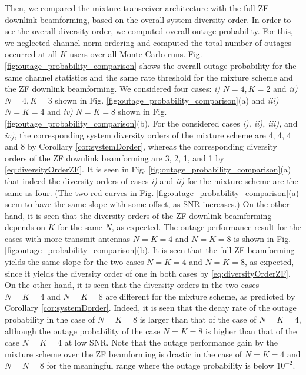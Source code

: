 \documentclass[11pt, draft, onecolumn ]{IEEEtran}
\begin{document}
Then, we compared the mixture transceiver architecture with the full ZF downlink beamforming, based on the overall system diversity order. In order to see the overall diversity order, we computed overall outage probability. For this, we neglected channel norm ordering and computed the total number of outages occurred at all $K$ users  over all Monte Carlo runs.
 Fig. \ref{fig:outage_probability_comparison} shows the overall outage probability for the same channel statistics and the same rate threshold for the mixture scheme and the ZF downlink beamforming.
We considered four cases: {\em i)}  $N=4,K=2$ and {\em ii)} $N=4,K=3$ shown in  Fig. \ref{fig:outage_probability_comparison}(a) and  {\em iii)} $N=K=4$ and {\em iv)} $N=K=8$ shown in  Fig. \ref{fig:outage_probability_comparison}(b).
For the considered cases {\em i), ii), iii),} and {\em iv)}, the corresponding system diversity orders of the mixture scheme are 4, 4, 4 and 8  by Corollary  \ref{cor:systemDorder}, whereas the corresponding diversity orders of the ZF downlink beamforming are 3, 2, 1, and 1 by \eqref{eq:diversityOrderZF}.  It is seen in Fig. \ref{fig:outage_probability_comparison}(a)  that indeed the diversity orders of cases {\em i)} and {\em ii)} for the mixture scheme are the same as four. (The two red curves in Fig. \ref{fig:outage_probability_comparison}(a) seem to have the same slope with some offset, as SNR increases.)  On the other hand, it is seen that the diversity orders of the ZF downlink beamforming depends on $K$ for the same $N$, as expected.   The outage performance result for  the cases with more transmit antennas $N=K=4$ and $N=K=8$ is shown in Fig. \ref{fig:outage_probability_comparison}(b).  It is seen that the full ZF beamforming yields the same slope for the two cases $N=K=4$ and $N=K=8$, as expected, since it yields the diversity order of one in both cases by \eqref{eq:diversityOrderZF}.
On the other hand, it is seen that the diversity orders in the two cases $N=K=4$ and $N=K=8$ are different for the mixture scheme, as predicted by Corollary  \ref{cor:systemDorder}. Indeed, it is seen that the decay rate of the outage probability in the case of $N=K=8$ is larger than that of the case of $N=K=4$, although the outage probability of the case $N=K=8$ is higher than that of the case $N=K=4$ at low SNR. Note that the outage performance gain by the mixture scheme over the ZF beamforming is drastic in the case of  $N=K=4$ and $N=N=8$ for the meaningful range where the outage probability is below $10^{-2}$.
\end{document}

